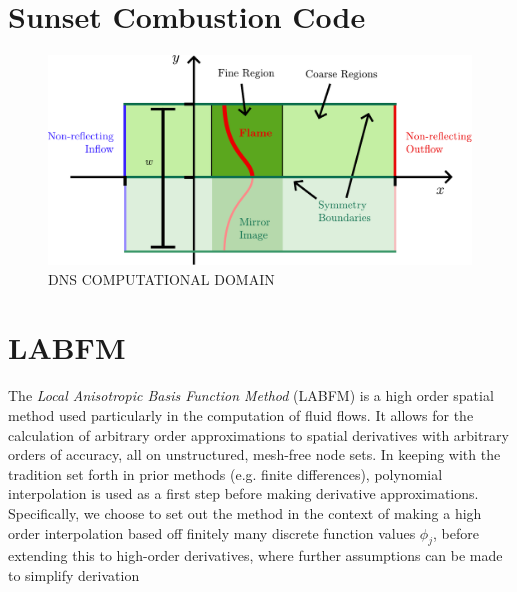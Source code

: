 
\section{Sunset Combustion Code}



\begin{figure}[t]
\centering
\includegraphics[scale=0.6]{assets/imgs/DNS-computational-domain.pdf}
\caption{DNS COMPUTATIONAL DOMAIN}
\label{fig:DNS-domain}
\end{figure}





\section{LABFM}

The \emph{Local Anisotropic Basis Function Method} (LABFM) \cite{king2024MeshFreeFrameworkHighOrder, king2020HighOrderDifference, king2024MeshfreeFrameworkHighorder, king2022HighorderSimulationsIsothermal, king2024SunsetFlamesDNSCode, broadley2025HighorderMeshfreeDirect, starepravo2025CanNeuralNetworks} is a high order spatial method used particularly in the computation of fluid flows. It allows for the calculation of arbitrary order approximations to spatial derivatives with arbitrary orders of accuracy, all on unstructured, mesh-free node sets. In keeping with the tradition set forth in prior methods (e.g. finite differences), polynomial interpolation is used as a first step before making derivative approximations. Specifically, we choose to set out the method in the context of making a high order interpolation based off finitely many discrete function values $\phi_j$, before extending this to high-order derivatives, where further assumptions can be made to simplify derivation


